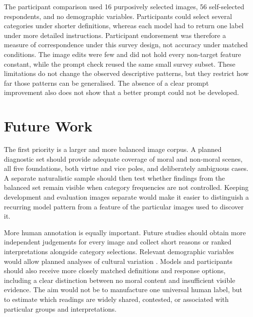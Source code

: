 The participant comparison used 16 purposively selected images, 56
self-selected respondents, and no demographic variables. Participants could
select several categories under shorter definitions, whereas each model had to
return one label under more detailed instructions. Participant endorsement was
therefore a measure of correspondence under this survey design, not accuracy
under matched conditions. The image edits were few and did not hold every
non-target feature constant, while the prompt check reused the same small
survey subset. These limitations do not change the observed descriptive
patterns, but they restrict how far those patterns can be generalised. The
absence of a clear prompt improvement also does not show that a better prompt
could not be developed.


\section{Future Work}
\label{sec:future_work}

The first priority is a larger and more balanced image corpus. A planned
diagnostic set should provide adequate coverage of moral and non-moral scenes,
all five foundations, both virtue and vice poles, and deliberately ambiguous
cases. A separate naturalistic sample should then test whether findings from
the balanced set remain visible when category frequencies are not controlled.
Keeping development and evaluation images separate would make it easier to
distinguish a recurring model pattern from a feature of the particular images
used to discover it.

More human annotation is equally important. Future studies should obtain more
independent judgements for every image and collect short reasons or ranked
interpretations alongside category selections. Relevant demographic variables
would allow planned analyses of cultural variation
\cite{atari2023weird,yadav2025beyond}. Models and participants should also
receive more closely matched definitions and response options, including a
clear distinction between no moral content and insufficient visible evidence.
The aim would not be to manufacture one universal human label, but to estimate
which readings are widely shared, contested, or associated with particular
groups and interpretations.

